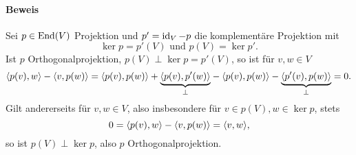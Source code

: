 \paragraph{Beweis}
	Sei $ p\in \operatorname{End}(V) $ Projektion und $ p' = \operatorname{id}_V - p $ die komplementäre Projektion mit
		\[ \ker p = p'(V) \text{ und } p(V) = \ker p'. \]
	Ist $ p $ Orthogonalprojektion, $ p(V)\perp \ker p = p'(V) $, so ist für $ v,w\in V $
		\[ \langle p(v),w \rangle-\langle v,p(w) \rangle = \langle p(v),p(w) \rangle+\underset{\perp}{\underbrace{\langle p(v),p'(w) \rangle}} - \langle p(v),p(w) \rangle-\underset{\perp}{\underbrace{\langle p'(v),p(w) \rangle}} = 0. \]
	Gilt andererseits für $ v,w\in V $, also insbesondere für $ v\in p(V), w\in \ker p $, stets
		\[ 0 = \langle p(v),w \rangle-\langle v,p(w) \rangle = \langle v,w \rangle, \]
	so ist $ p(V)\perp \ker p $, also $ p $ Orthogonalprojektion.